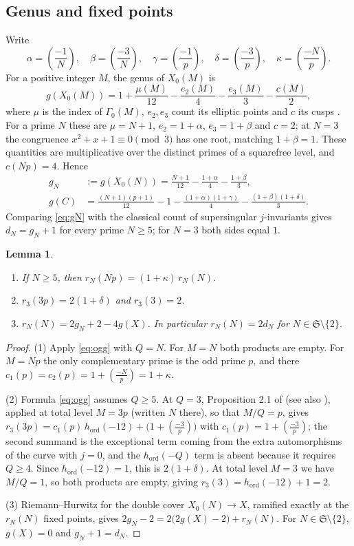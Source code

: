 \documentclass[11pt,a4paper]{article}
\newtheorem{lemma}[theorem]{Lemma}
\theoremstyle{remark}\newtheorem{remark}[theorem]{Remark}
\numberwithin{equation}{section}
\newcommand{\leg}[2]{\left(\frac{#1}{#2}\right)}
\newcommand{\ho}{h_{\mathrm{ord}}}
\begin{document}
	\subsection{Genus and fixed points}
	Write
	\[
	\alpha=\leg{-1}{N},\quad\beta=\leg{-3}{N},\quad\gamma=\leg{-1}{p},\quad\delta=\leg{-3}{p},\quad\kappa=\leg{-N}{p}.
	\]
	For a positive integer $M$, the genus of $X_0(M)$ is
	\[
	g(X_0(M))=1+\frac{\mu(M)}{12}-\frac{e_2(M)}4-\frac{e_3(M)}3-\frac{c(M)}2,
	\]
	where $\mu$ is the index of $\Gamma_0(M)$, $e_2,e_3$ count its elliptic points and $c$ its cusps \cite[Theorem 3.1.1 and Section 3.9]{DS}. For a prime $N$ these are $\mu=N+1$, $e_2=1+\alpha$, $e_3=1+\beta$ and $c=2$; at $N=3$ the congruence $x^2+x+1\equiv0\pmod 3$ has one root, matching $1+\beta=1$. These quantities are multiplicative over the distinct primes of a squarefree level, and $c(Np)=4$. Hence
	\begin{align}
		g_N&:=g(X_0(N))=\frac{N+1}{12}-\frac{1+\alpha}4-\frac{1+\beta}3,\label{eq:gN}\\
		g(C)&=\frac{(N+1)(p+1)}{12}-1-\frac{(1+\alpha)(1+\gamma)}4-\frac{(1+\beta)(1+\delta)}3.\label{eq:gC}
	\end{align}
	Comparing \eqref{eq:gN} with the classical count of supersingular $j$-invariants \cite[Theorem V.4.1(c)]{Sil} gives $d_N=g_N+1$ for every prime $N\geq5$; for $N=3$ both sides equal $1$.
	
	\begin{lemma}\label{lem:fixedN}
		\begin{enumerate}
			\item If $N\geq5$, then $r_N(Np)=(1+\kappa)\,r_N(N)$.
			\item $r_3(3p)=2(1+\delta)$ and $r_3(3)=2$.
			\item $r_N(N)=2g_N+2-4g(X)$. In particular $r_N(N)=2d_N$ for $N\in\mathfrak S\setminus\{2\}$.
		\end{enumerate}
	\end{lemma}
	\begin{proof}
		(1) Apply \eqref{eq:ogg} with $Q=N$. For $M=N$ both products are empty. For $M=Np$ the only complementary prime is the odd prime $p$, and there $c_1(p)=c_2(p)=1+\leg{-N}{p}=1+\kappa$.
		
		(2) Formula \eqref{eq:ogg} assumes $Q\geq5$. At $Q=3$, Proposition 2.1 of \cite{IJK} (see also \cite[Remark 2]{FH}), applied at total level $M=3p$ (written $N$ there), so that $M/Q=p$, gives $r_3(3p)=c_1(p)\,\ho(-12)+\bigl(1+\leg{-3}{p}\bigr)$ with $c_1(p)=1+\leg{-3}{p}$; the second summand is the exceptional term coming from the extra automorphisms of the curve with $j=0$, and the $\ho(-Q)$ term is absent because it requires $Q\geq4$. Since $\ho(-12)=1$, this is $2(1+\delta)$. At total level $M=3$ we have $M/Q=1$, so both products are empty, giving $r_3(3)=\ho(-12)+1=2$.
		
		(3) Riemann--Hurwitz for the double cover $X_0(N)\to X$, ramified exactly at the $r_N(N)$ fixed points, gives $2g_N-2=2\bigl(2g(X)-2\bigr)+r_N(N)$. For $N\in\mathfrak S\setminus\{2\}$, $g(X)=0$ and $g_N+1=d_N$.
	\end{proof}
	
\end{document}
